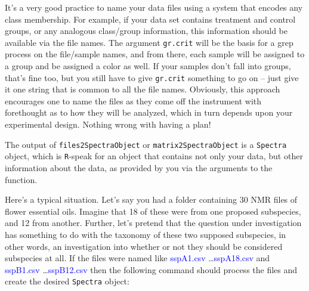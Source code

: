 \documentclass[letter,10pt,twocolumn,twoside,printwatermark=false]{pinp}
\begin{document}
It's a very good practice to name your data files using a system that
encodes any class membership. For example, if your data set contains
treatment and control groups, or any analogous class/group information,
this information should be available via the file names. The argument
\texttt{gr.crit} will be the basis for a grep process on the file/sample
names, and from there, each sample will be assigned to a group and be
assigned a color as well. If your samples don't fall into groups, that's
fine too, but you still have to give \texttt{gr.crit} something to go on
-- just give it one string that is common to all the file names.
Obviously, this approach encourages one to name the files as they come
off the instrument with forethought as to how they will be analyzed,
which in turn depends upon your experimental design. Nothing wrong with
having a plan!

The output of \texttt{files2SpectraObject} or
\texttt{matrix2SpectraObject} is a \texttt{Spectra} object, which is
\texttt{R}-speak for an object that contains not only your data, but
other information about the data, as provided by you via the arguments
to the function.

Here's a typical situation. Let's say you had a folder containing 30 NMR
files of flower essential oils. Imagine that 18 of these were from one
proposed subspecies, and 12 from another. Further, let's pretend that
the question under investigation has something to do with the taxonomy
of these two supposed subspecies, in other words, an investigation into
whether or not they should be considered subspecies at all. If the files
were named like \textcolor{blue}{sspA1.csv}
\ldots \textcolor{blue}{sspA18.csv} and \textcolor{blue}{sspB1.csv}
\ldots \textcolor{blue}{sspB12.csv} then the following command should
process the files and create the desired \texttt{Spectra} object:

\begin{Shaded}
\begin{Highlighting}[]
\StringTok{ }\NormalTok{(}
   \NormalTok{(}\NormalTok{, }\NormalTok{),}
   \NormalTok{(}\NormalTok{, }\NormalTok{),}
   \NormalTok{,}
   \NormalTok{,}
   \NormalTok{,}
   \NormalTok{)}
\end{Highlighting}
\end{Shaded}
\end{document}
